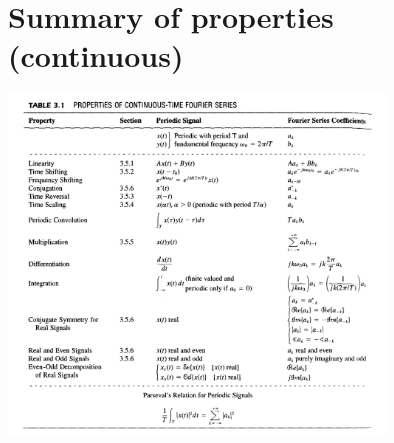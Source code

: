 \documentclass{report}
\begin{document}
\section{Summary of properties (continuous)}
\begin{center}
\includegraphics[width=10cm]{a63}
\end{center}
\newpage
\end{document}
